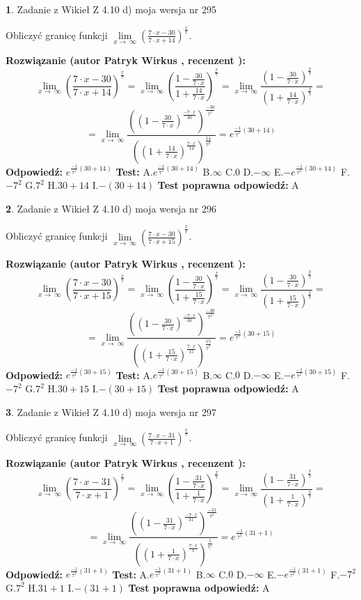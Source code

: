 \documentclass[12pt, a4paper]{article}
\theoremstyle{definition} %
\newtheorem{zad}{}
\newcommand{\zadStart}[1]{\begin{zad}#1\newline}
\newcommand{\zadStop}{\end{zad}}
\newcommand{\rozwStart}[2]{\noindent \textbf{Rozwiązanie (autor #1 , recenzent #2): }\newline}
\newcommand{\rozwStop}{\newline}
\newcommand{\odpStart}{\noindent \textbf{Odpowiedź:}\newline}
\newcommand{\odpStop}{\newline}
\newcommand{\testStart}{\noindent \textbf{Test:}\newline}
\newcommand{\testStop}{\newline}
\newcommand{\kluczStart}{\noindent \textbf{Test poprawna odpowiedź:}\newline}
\newcommand{\kluczStop}{\newline}
\begin{document}
\zadStart{Zadanie z Wikieł Z 4.10 d) moja wersja nr 295}


Obliczyć granicę funkcji  $\lim\limits_{x\to\ \infty}(\frac{7\cdot x-30}{7\cdot x+14})^{\frac{x}{7}}$.
\zadStop
\rozwStart{Patryk Wirkus}{}
$$\lim\limits_{x\to\ \infty}(\frac{7\cdot x-30}{7\cdot x+14})^{\frac{x}{7}} = \lim\limits_{x\to\ \infty}(\frac{1-\frac{30}{7\cdot x}}{1+\frac{14}{7\cdot x}})^{\frac{x}{7}}=\lim\limits_{x\to\ \infty}\frac{(1-\frac{30}{7\cdot x})^{\frac{x}{7}}}{(1+\frac{14}{7\cdot x})^{\frac{x}{7}}}=$$
$$=\lim\limits_{x\to\ \infty}\frac{((1-\frac{30}{7\cdot x})^{\frac{-7\cdot x}{30}})^{\frac{-30}{7^{2}}}}{((1+\frac{14}{7\cdot x})^{\frac{7\cdot x}{14}})^{\frac{14}{7^{2}}}}=e^{\frac{-1}{7^{2}}(30+14)}$$
\rozwStop
\odpStart
$e^{\frac{-1}{7^{2}}(30+14)}$
\odpStop
\testStart
A.$e^{\frac{-1}{7^{2}}(30+14)}$ B.$\infty$ C.$0$ D.$-\infty$ E.$-e^{\frac{-1}{7^{2}}(30+14)}$
F.$-7^{2}$ G.$7^{2}$
H.$30+14$
I.$-(30+14)$
\testStop
\kluczStart
A
\kluczStop



\zadStart{Zadanie z Wikieł Z 4.10 d) moja wersja nr 296}


Obliczyć granicę funkcji  $\lim\limits_{x\to\ \infty}(\frac{7\cdot x-30}{7\cdot x+15})^{\frac{x}{7}}$.
\zadStop
\rozwStart{Patryk Wirkus}{}
$$\lim\limits_{x\to\ \infty}(\frac{7\cdot x-30}{7\cdot x+15})^{\frac{x}{7}} = \lim\limits_{x\to\ \infty}(\frac{1-\frac{30}{7\cdot x}}{1+\frac{15}{7\cdot x}})^{\frac{x}{7}}=\lim\limits_{x\to\ \infty}\frac{(1-\frac{30}{7\cdot x})^{\frac{x}{7}}}{(1+\frac{15}{7\cdot x})^{\frac{x}{7}}}=$$
$$=\lim\limits_{x\to\ \infty}\frac{((1-\frac{30}{7\cdot x})^{\frac{-7\cdot x}{30}})^{\frac{-30}{7^{2}}}}{((1+\frac{15}{7\cdot x})^{\frac{7\cdot x}{15}})^{\frac{15}{7^{2}}}}=e^{\frac{-1}{7^{2}}(30+15)}$$
\rozwStop
\odpStart
$e^{\frac{-1}{7^{2}}(30+15)}$
\odpStop
\testStart
A.$e^{\frac{-1}{7^{2}}(30+15)}$ B.$\infty$ C.$0$ D.$-\infty$ E.$-e^{\frac{-1}{7^{2}}(30+15)}$
F.$-7^{2}$ G.$7^{2}$
H.$30+15$
I.$-(30+15)$
\testStop
\kluczStart
A
\kluczStop



\zadStart{Zadanie z Wikieł Z 4.10 d) moja wersja nr 297}


Obliczyć granicę funkcji  $\lim\limits_{x\to\ \infty}(\frac{7\cdot x-31}{7\cdot x+1})^{\frac{x}{7}}$.
\zadStop
\rozwStart{Patryk Wirkus}{}
$$\lim\limits_{x\to\ \infty}(\frac{7\cdot x-31}{7\cdot x+1})^{\frac{x}{7}} = \lim\limits_{x\to\ \infty}(\frac{1-\frac{31}{7\cdot x}}{1+\frac{1}{7\cdot x}})^{\frac{x}{7}}=\lim\limits_{x\to\ \infty}\frac{(1-\frac{31}{7\cdot x})^{\frac{x}{7}}}{(1+\frac{1}{7\cdot x})^{\frac{x}{7}}}=$$
$$=\lim\limits_{x\to\ \infty}\frac{((1-\frac{31}{7\cdot x})^{\frac{-7\cdot x}{31}})^{\frac{-31}{7^{2}}}}{((1+\frac{1}{7\cdot x})^{\frac{7\cdot x}{1}})^{\frac{1}{7^{2}}}}=e^{\frac{-1}{7^{2}}(31+1)}$$
\rozwStop
\odpStart
$e^{\frac{-1}{7^{2}}(31+1)}$
\odpStop
\testStart
A.$e^{\frac{-1}{7^{2}}(31+1)}$ B.$\infty$ C.$0$ D.$-\infty$ E.$-e^{\frac{-1}{7^{2}}(31+1)}$
F.$-7^{2}$ G.$7^{2}$
H.$31+1$
I.$-(31+1)$
\testStop
\kluczStart
A
\kluczStop
\end{document}
